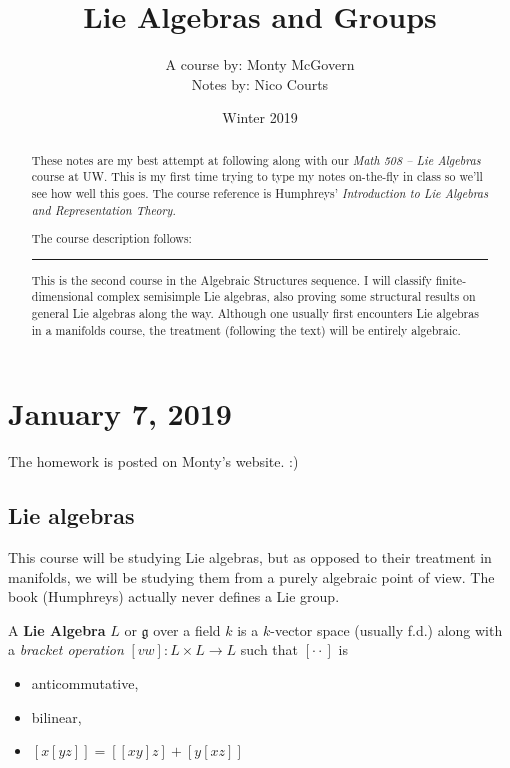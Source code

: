 \documentclass[12pt]{article}
\theoremstyle{nonumberbreak}
\theoremstyle{changebreak}
\theoremstyle{nonumberbreak}
\theoremstyle{change}
\newcommand*{\brk}{
\rule{2in}{.1pt}
}
\begin{document}
\title{Lie Algebras and Groups\vspace{-1ex}}
\author{A course by: Monty McGovern\\
Notes by: Nico Courts}
\date{Winter 2019}
\maketitle

\renewcommand{\abstractname}{Introduction}
\begin{abstract}
	These notes are my best attempt at following along with our \textit{Math 508 --
	Lie Algebras} course at UW. This is my first time trying to type my 
	notes on-the-fly in class so we'll see how well this goes. The course reference
	is Humphreys' \textit{Introduction to Lie Algebras and Representation Theory.}

	The course description follows:
	
	\brk

	This is the second course in the Algebraic Structures sequence. I will classify 
	finite-dimensional complex semisimple Lie algebras, also proving some structural 
	results on general Lie algebras along the way. Although one usually first 
	encounters Lie algebras in a manifolds course, the treatment (following the text) 
	will be entirely algebraic.
\end{abstract}

\section{January 7, 2019}
The homework is posted on Monty's website. :) 
\subsection{Lie algebras}

This course will be studying Lie algebras, but as opposed to their treatment in manifolds, 
we will be studying them from a purely algebraic point of view. The book (Humphreys)
actually never defines a Lie group.

\begin{defn}
	A \textbf{Lie Algebra} $L$ or $\mathfrak{g}$ over a field $k$ is a $k$-vector space (usually f.d.)
	along with a \textit{bracket operation} $[vw]:L\times L\to L$ such that $[\cdot\cdot]$ is 
	\begin{itemize}
		\item anticommutative,
		\item bilinear,
		\item $[x[yz]]=[[xy]z]+[y[xz]]$
	\end{itemize}
\end{defn}
\end{document}
